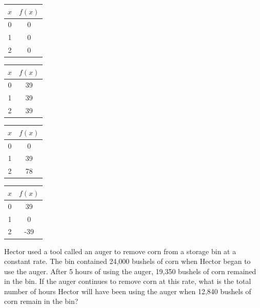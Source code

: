 \vspace{0.5em}
\begin{oneparchoices}
  \choice \parbox[t][1.35in][t]{0.38\linewidth}{\centering
    \begin{tabular}{|c|c|}
    \hline
    $x$ & $f(x)$ \\
    \hline
    0 & 0 \\
    \hline
    1 & 0 \\
    \hline
    2 & 0 \\
    \hline
    \end{tabular}}
  \choice \parbox[t][1.35in][t]{0.38\linewidth}{\centering
    \begin{tabular}{|c|c|}
    \hline
    $x$ & $f(x)$ \\
    \hline
    0 & 39 \\
    \hline
    1 & 39 \\
    \hline
    2 & 39 \\
    \hline
    \end{tabular}}
  \CorrectChoice \parbox[t][1.35in][t]{0.38\linewidth}{\centering
    \begin{tabular}{|c|c|}
    \hline
    $x$ & $f(x)$ \\
    \hline
    0 & 0 \\
    \hline
    1 & 39 \\
    \hline
    2 & 78 \\
    \hline
    \end{tabular}}
  \choice \parbox[t][1.35in][t]{0.38\linewidth}{\centering
    \begin{tabular}{|c|c|}
    \hline
    $x$ & $f(x)$ \\
    \hline
    0 & 39 \\
    \hline
    1 & 0 \\
    \hline
    2 & -39 \\
    \hline
    \end{tabular}}
\end{oneparchoices}

\question[1]
Hector used a tool called an auger to remove corn from a storage bin at a constant rate. The bin contained 24,000 bushels of corn when Hector began to use the auger. After 5 hours of using the auger, 19,350 bushels of corn remained in the bin. If the auger continues to remove corn at this rate, what is the total number of hours Hector will have been using the auger when 12,840 bushels of corn remain in the bin?
\begin{choices}
\end{choices}

